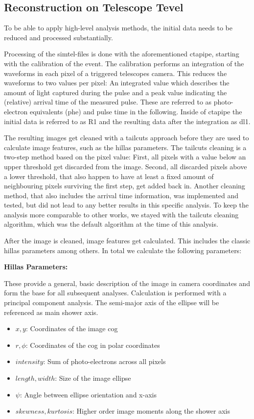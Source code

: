\subsection{Reconstruction on Telescope Tevel}
\label{sec:tel_analysis}

To be able to apply high-level analysis methods, the initial data 
needs to be reduced and processed substantially.

Processing of the simtel-files is done with the aforementioned ctapipe, starting with 
the calibration of the event. The calibration performs an integration of the waveforms in 
each pixel of a triggered telescopes camera. 
This reduces the waveforms to two values per pixel: An integrated value which describes 
the amount of light captured during the pulse and a peak value indicating the 
(relative) arrival time of the measured pulse. These are referred to as 
photo-electron equivalents (phe) and pulse time in the following.
Inside of ctapipe the initial data is referred to as R1
and the resulting data after the integration as dl1.

The resulting images get cleaned with a tailcuts approach before they are
used to calculate image features, such as the hillas parameters.
The tailcuts cleaning is a two-step method based on the pixel value:
First, all pixels with a value below an upper threshold get discarded from 
the image. Second, all discarded pixels above a lower threshold, that also 
happen to have at least a fixed amount of neighbouring pixels surviving the first step,
get added back in.
Another cleaning method, that also includes the arrival time information, 
was implemented and tested, but did not lead to any better results in this
specific analysis.
To keep the analysis more comparable to other works, we stayed with 
the tailcuts cleaning algorithm, which was the default algorithm at the time 
of this analysis.

After the image is cleaned, image features get calculated.
This includes the classic hillas parameters among others.
In total we calculate the following parameters:

\textbf{Hillas Parameters:}

These provide a general, basic description of the image 
in camera coordinates and form the base for 
all subsequent analyses. Calculation is performed with a
principal component analysis. The semi-major axis of the ellipse
will be referenced as main shower axis.

\begin{itemize}
    \item{$x, y$: Coordinates of the image cog}
    \item{$r, \phi$: Coordinates of the cog in polar coordinates}
    \item{$intensity$: Sum of photo-electrons across all pixels}
    \item{$length, width$: Size of the image ellipse}
    \item{$\psi$: Angle between ellipse orientation and x-axis}
    \item{$skewness, kurtosis$: Higher order image moments along the shower axis}
\end{itemize}

